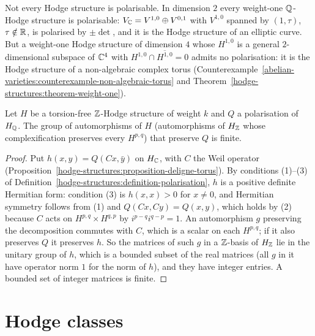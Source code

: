 \begin{counterexample}\label{hodge-structures:counterexample-not-polarisable}
Not every Hodge structure is polarisable. In dimension $2$ every weight-one $\mathbb{Q}$-Hodge structure is polarisable: $V_{\mathbb{C}} = V^{1,0} \oplus V^{0,1}$ with $V^{1,0}$ spanned by $(1, \tau)$,
$\tau \notin \mathbb{R}$, is polarised by $\pm\det$, and it is the Hodge structure of an elliptic curve. But a weight-one Hodge structure of dimension $4$ whose $H^{1,0}$ is a general $2$-dimensional
subspace of $\mathbb{C}^4$ with $H^{1,0} \cap \overline{H^{1,0}} = 0$ admits no polarisation: it is the Hodge structure of a non-algebraic complex torus
(Counterexample~\ref{abelian-varieties:counterexample-non-algebraic-torus} and Theorem~\ref{hodge-structures:theorem-weight-one}).
\end{counterexample}

\begin{proposition}\label{hodge-structures:proposition-automorphisms-finite}
Let $H$ be a torsion-free $\mathbb{Z}$-Hodge structure of weight $k$ and $Q$ a polarisation of $H_{\mathbb{Q}}$. The group of automorphisms of $H$ (automorphisms of $H_{\mathbb{Z}}$ whose complexification preserves every
$H^{p,q}$) that preserve $Q$ is finite.
\end{proposition}

\begin{proof}
Put $h(x, y) = Q(Cx, \bar y)$ on $H_{\mathbb{C}}$, with $C$ the Weil operator (Proposition~\ref{hodge-structures:proposition-deligne-torus}). By conditions (1)--(3) of
Definition~\ref{hodge-structures:definition-polarisation}, $h$ is a positive definite Hermitian form: condition (3) is $h(x, x) > 0$ for $x \neq 0$, and Hermitian symmetry follows from (1) and
$Q(Cx, Cy) = Q(x, y)$, which holds by (2) because $C$ acts on $H^{p,q} \times H^{q,p}$ by $i^{p-q}i^{q-p} = 1$. An automorphism $g$ preserving the decomposition commutes with $C$, which is a scalar on each
$H^{p,q}$; if it also preserves $Q$ it preserves $h$. So the matrices of such $g$ in a $\mathbb{Z}$-basis of $H_{\mathbb{Z}}$ lie in the unitary group of $h$, which is a bounded subset of the real matrices (all $g$ in it have
operator norm $1$ for the norm of $h$), and they have integer entries. A bounded set of integer matrices is finite.
\end{proof}

\section{Hodge classes}\label{hodge-structures:section-hodge-classes}

